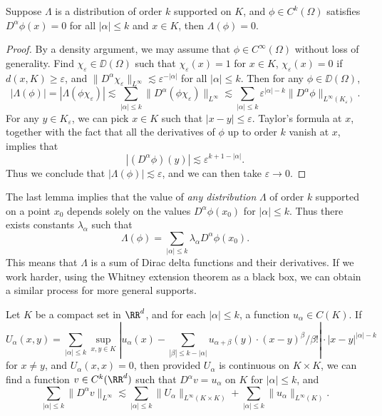 \begin{lemma}
    Suppose $\Lambda$ is a distribution of order $k$ supported on $K$, and $\phi \in C^k(\Omega)$ satisfies $D^\alpha \phi(x) = 0$ for all $|\alpha| \leq k$ and $x \in K$, then $\Lambda(\phi) = 0$.
\end{lemma}
\begin{proof}
    By a density argument, we may assume that $\phi \in C^\infty(\Omega)$ without loss of generality. Find $\chi_\varepsilon \in \DD(\Omega)$ such that $\chi_\varepsilon(x) = 1$ for $x \in K$, $\chi_\varepsilon(x) = 0$ if $d(x,K) \geq \varepsilon$, and $\| D^\alpha \chi_\varepsilon \|_{L^\infty} \lesssim \varepsilon^{-|\alpha|}$ for all $|\alpha| \leq k$. Then for any $\phi \in \DD(\Omega)$,
    \[ |\Lambda(\phi)| = |\Lambda(\phi \chi_\varepsilon)| \lesssim \sum_{|\alpha| \leq k} \| D^\alpha(\phi \chi_\varepsilon) \|_{L^\infty} \lesssim \sum_{|\alpha| \leq k} \varepsilon^{|\alpha|-k} \| D^\alpha \phi \|_{L^\infty(K_\varepsilon)}. \]
    For any $y \in K_\varepsilon$, we can pick $x \in K$ such that $|x - y| \leq \varepsilon$. Taylor's formula at $x$, together with the fact that all the derivatives of $\phi$ up to order $k$ vanish at $x$, implies that
    \[ |(D^\alpha \phi)(y)| \lesssim \varepsilon^{k+1 - |\alpha|}. \]
    Thus we conclude that $|\Lambda(\phi)| \lesssim \varepsilon$, and we can then take $\varepsilon \to 0$.
\end{proof}

The last lemma implies that the value of \emph{any distribution} $\Lambda$ of order $k$ supported on a point $x_0$ depends solely on the values $D^\alpha \phi(x_0)$ for $|\alpha| \leq k$. Thus there exists constants $\lambda_\alpha$ such that
%
\[ \Lambda(\phi) = \sum_{|\alpha| \leq k} \lambda_\alpha D^\alpha \phi(x_0). \]
%
This means that $\Lambda$ is a sum of Dirac delta functions and their derivatives. If we work harder, using the Whitney extension theorem as a black box, we can obtain a similar process for more general supports.

\begin{theorem}[Whitney]
    Let $K$ be a compact set in $\RR^d$, and for each $|\alpha| \leq k$, a function $u_\alpha \in C(K)$. If
    \[ U_\alpha(x,y) = \sum_{|\alpha| \leq k} \sup_{x,y \in K} \left| u_\alpha(x) - \sum_{|\beta| \leq k - |\alpha|} u_{\alpha + \beta}(y) \cdot (x - y)^\beta / \beta! \right| \cdot |x - y|^{|\alpha| - k}  \]
    for $x \neq y$, and $U_\alpha(x,x) = 0$, then provided $U_\alpha$ is continuous on $K \times K$, we can find a function $v \in C^k(\RR^d)$ such that $D^\alpha v = u_\alpha$ on $K$ for $|\alpha| \leq k$, and
    \[ \sum_{|\alpha| \leq k} \| D^\alpha v \|_{L^\infty} \lesssim \sum_{|\alpha| \leq k} \| U_\alpha \|_{L^\infty(K \times K)} + \sum_{|\alpha| \leq k} \| u_\alpha \|_{L^\infty(K)}. \]
\end{theorem}


